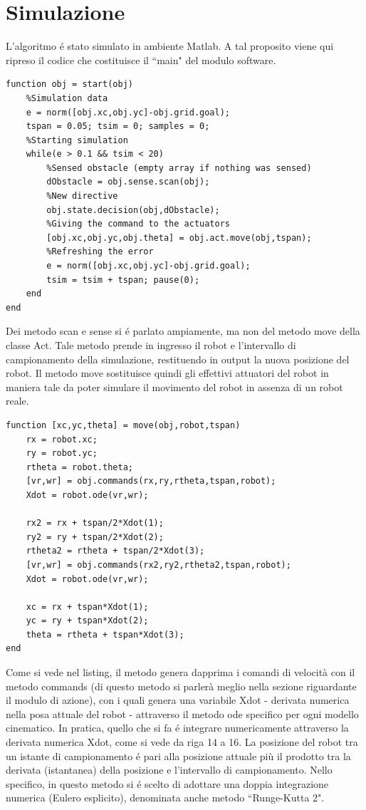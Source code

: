 \documentclass[14pt,a4paper]{extarticle}
\begin{document}
\section{Simulazione}
L'algoritmo é stato simulato in ambiente Matlab. A tal proposito viene qui ripreso il codice che costituisce il ``main" del modulo software. 
\begin{lstlisting}[caption=Entry point del modulo software]
function obj = start(obj)
	%Simulation data
	e = norm([obj.xc,obj.yc]-obj.grid.goal);
	tspan = 0.05; tsim = 0; samples = 0;
	%Starting simulation
	while(e > 0.1 && tsim < 20)
		%Sensed obstacle (empty array if nothing was sensed)
		dObstacle = obj.sense.scan(obj);
		%New directive
		obj.state.decision(obj,dObstacle);
		%Giving the command to the actuators 
		[obj.xc,obj.yc,obj.theta] = obj.act.move(obj,tspan);
		%Refreshing the error
		e = norm([obj.xc,obj.yc]-obj.grid.goal); 
		tsim = tsim + tspan; pause(0);
	end
end
\end{lstlisting}
Dei metodo scan e sense si é parlato ampiamente, ma non del metodo move della classe Act. Tale metodo prende in ingresso il robot e l'intervallo di campionamento della simulazione, restituendo in output la nuova posizione del robot. Il metodo move sostituisce quindi gli effettivi attuatori del robot in maniera tale da poter simulare il movimento del robot in assenza di un robot reale.
\begin{lstlisting}[caption=Metodo responsabile di far muovere il robot in simulazione]
function [xc,yc,theta] = move(obj,robot,tspan)
	rx = robot.xc;
	ry = robot.yc;
	rtheta = robot.theta;
	[vr,wr] = obj.commands(rx,ry,rtheta,tspan,robot);
	Xdot = robot.ode(vr,wr);
            
	rx2 = rx + tspan/2*Xdot(1);
	ry2 = ry + tspan/2*Xdot(2);
	rtheta2 = rtheta + tspan/2*Xdot(3);
	[vr,wr] = obj.commands(rx2,ry2,rtheta2,tspan,robot);
	Xdot = robot.ode(vr,wr);
            
	xc = rx + tspan*Xdot(1);
	yc = ry + tspan*Xdot(2);
	theta = rtheta + tspan*Xdot(3);
end
\end{lstlisting}
Come si vede nel listing, il metodo genera dapprima i comandi di velocità con il metodo commands (di questo metodo si parlerà meglio nella sezione riguardante il modulo di azione), con i quali genera una variabile Xdot - derivata numerica nella posa attuale del robot - attraverso il metodo ode specifico per ogni modello cinematico. In pratica, quello che si fa é integrare numericamente attraverso la derivata numerica Xdot, come si vede da riga 14 a 16. La posizione del robot tra un istante di campionamento é pari alla posizione attuale più il prodotto tra la derivata (istantanea) della posizione e l'intervallo di campionamento. Nello specifico, in questo metodo si é scelto di adottare una doppia integrazione numerica (Eulero esplicito), denominata anche metodo ``Runge-Kutta 2". \\
\end{document}
